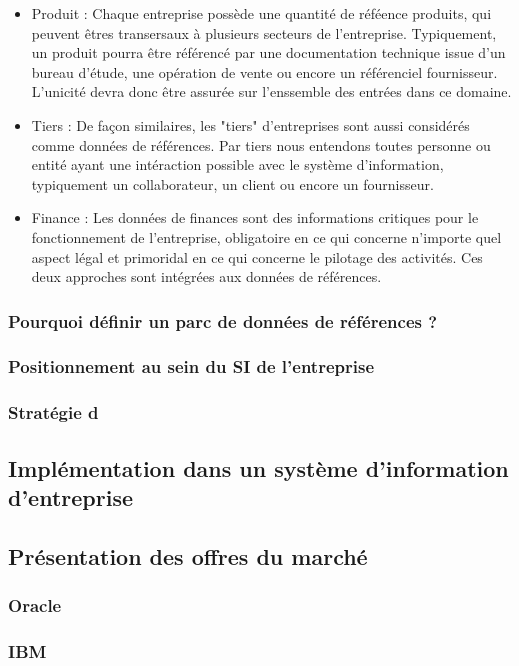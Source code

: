 \begin{itemize}
\item Produit : Chaque entreprise possède une quantité de réféence produits, qui peuvent êtres transersaux à plusieurs secteurs de l'entreprise. Typiquement, un produit pourra être référencé par une documentation technique issue d'un bureau d'étude, une opération de vente  ou encore un référenciel fournisseur. L'unicité devra donc être assurée sur l'enssemble des entrées dans ce domaine.
\item Tiers : De façon similaires, les "tiers" d'entreprises sont aussi considérés comme données de références. Par tiers nous entendons toutes personne ou entité ayant une intéraction possible avec le système d'information, typiquement un collaborateur, un client ou encore un fournisseur.
\item Finance  : Les données de finances sont des informations critiques pour le fonctionnement de l'entreprise, obligatoire en ce qui concerne n'importe quel aspect légal et primoridal en ce qui concerne le pilotage des activités. Ces deux approches sont intégrées aux données de références.
\end{itemize}


\subsubsection{Pourquoi définir un parc de données de références ?}

\subsubsection{Positionnement au sein du SI de l'entreprise}

\subsubsection{Stratégie d}

\subsection{Implémentation dans un système d'information d'entreprise}

\subsection{Présentation des offres du marché}

\subsubsection{Oracle}

\subsubsection{IBM}
